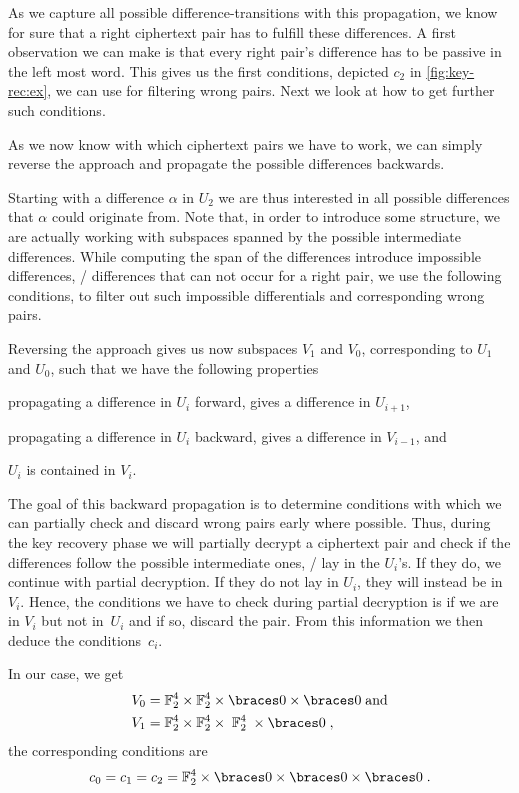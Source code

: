 As we capture all possible difference-transitions with this propagation, we know for sure that a right ciphertext pair has to fulfill these differences.
A first observation we can make is that every right pair's difference has to be passive in the left most word.
This gives us the first conditions, depicted $c_2$ in \cref{fig:key-rec:ex}, we can use for filtering wrong pairs.
Next we look at how to get further such conditions.

As we now know with which ciphertext pairs we have to work, we can simply reverse the approach and propagate the possible differences backwards.

Starting with a difference $\alpha$ in $U_2$ we are thus interested in all possible differences that $\alpha$ could originate from.
Note that, in order to introduce some structure, we are actually working with subspaces spanned by the possible intermediate differences.
While computing the span of the differences introduce impossible differences, \ie/ differences that can not occur for a right pair, we use the following conditions, to filter out such impossible differentials and corresponding wrong pairs.

Reversing the approach gives us now subspaces $V_1$ and $V_0$, corresponding to $U_1$ and $U_0$, such that we have the following properties
\begin{inparaenum}
    \item propagating a difference in $U_i$ forward, gives a difference in $U_{i+1}$,
    \item propagating a difference in $U_i$ backward, gives a difference in $V_{i-1}$, and
    \item $U_i$ is contained in $V_i$.
\end{inparaenum}
The goal of this backward propagation is to determine conditions with which we can partially check and discard wrong pairs early where possible.
Thus, during the key recovery phase we will partially decrypt a ciphertext pair and check if the differences follow the possible intermediate ones, \ie/ lay in the $U_i$'s.
If they do, we continue with partial decryption.
If they do not lay in $U_i$, they will instead be in $V_i$.
Hence, the conditions we have to check during partial decryption is if we are in $V_i$ but not in~$U_i$ and if so, discard the pair.
From this information we then deduce the conditions~$c_i$.

In our case, we get
\begin{align*}
    V_0 &= \F_2^4 \times \F_2^4 \times \set{0} \times \set{0}\;\text{and}\\
    V_1 &= \F_2^4 \times \F_2^4 \times \;\F_2^4\; \times \set{0}\;,
\end{align*}
the corresponding conditions are
\begin{equation*}
    c_0 = c_1 = c_2 = \F_2^4 \times \set{0} \times \set{0} \times \set{0}\;.
\end{equation*}

